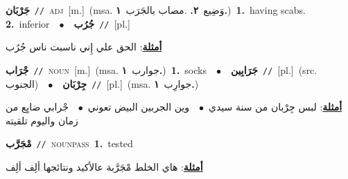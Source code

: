 \documentclass[10pt,a4paper,twoside]{article} %
\begin{document}
\begin{multicols}{2}
{\setlength\topsep{0pt}\textbf{\foreignlanguage{arabic}{جَرْبَان}}\ {\color{gray}\texttt{//}\color{black}}\ \textsc{adj}\ [m.]\ \color{gray}(msa. \foreignlanguage{arabic}{وَضِيع}~\foreignlanguage{arabic}{\textbf{٢.}}  .\foreignlanguage{arabic}{مصاب بالجَرَب}~\foreignlanguage{arabic}{\textbf{١.}})\color{black}\ \textbf{1.}~having scabs.  \textbf{2.}~inferior\ \ $\bullet$\ \ \setlength\topsep{0pt}\textbf{\foreignlanguage{arabic}{جُرُب}}\ {\color{gray}\texttt{//}\color{black}}\ [pl.]\  \begin{flushright}\color{gray}\foreignlanguage{arabic}{\textbf{\underline{\foreignlanguage{arabic}{أمثلة}}}: الحق علي إِني ناسبت ناس جُرُب}\end{flushright}\color{black}} \vspace{2mm}

{\setlength\topsep{0pt}\textbf{\foreignlanguage{arabic}{جْرَاب}}\ {\color{gray}\texttt{//}\color{black}}\ \textsc{noun}\ [m.]\ \color{gray}(msa. \foreignlanguage{arabic}{جوارب}~\foreignlanguage{arabic}{\textbf{١.}})\color{black}\ \textbf{1.}~socks\ \ $\bullet$\ \ \setlength\topsep{0pt}\textbf{\foreignlanguage{arabic}{جَرَابِين}}\ {\color{gray}\texttt{//}\color{black}}\ [pl.]\ (src. \color{gray}\foreignlanguage{arabic}{الجنوب}\color{black})\ \ $\bullet$\ \ \setlength\topsep{0pt}\textbf{\foreignlanguage{arabic}{جِرْبَان}}\ {\color{gray}\texttt{//}\color{black}}\ [pl.]\ \color{gray}(msa. \foreignlanguage{arabic}{جوارِب}~\foreignlanguage{arabic}{\textbf{١.}})\color{black}\  \begin{flushright}\color{gray}\foreignlanguage{arabic}{\textbf{\underline{\foreignlanguage{arabic}{أمثلة}}}: لبس جِرْبان من سنة سيدي\ $\bullet$\ \  وين الجربين البيض تعوني\ $\bullet$\ \  جْرابي ضايِع من زمان واليوم تلقيته}\end{flushright}\color{black}} \vspace{2mm}

{\setlength\topsep{0pt}\textbf{\foreignlanguage{arabic}{مْجَرَّب}}\ {\color{gray}\texttt{//}\color{black}}\ \textsc{noun\textunderscore pass}\ \textbf{1.}~tested\  \begin{flushright}\color{gray}\foreignlanguage{arabic}{\textbf{\underline{\foreignlanguage{arabic}{أمثلة}}}: هاي الخلط مْجَرَّبة عالأكيد ونتائجها ألِف  ألِف}\end{flushright}\color{black}} \vspace{2mm}


\end{multicols}
\end{document}
